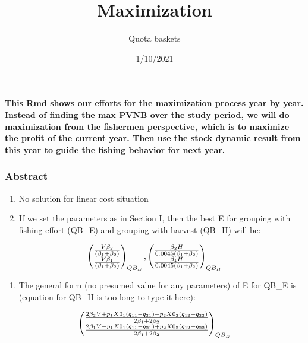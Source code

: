 \documentclass[
]{article}
\title{Maximization}
\author{Quota baskets}
\date{1/10/2021}
\providecommand{\tightlist}{%
  \setlength{\itemsep}{0pt}\setlength{\parskip}{0pt}}
\begin{document}
\maketitle

{
\setcounter{tocdepth}{2}
\tableofcontents
}
\textbf{This Rmd shows our efforts for the maximization process year by
year. Instead of finding the max PVNB over the study period, we will do
maximization from the fishermen perspective, which is to maximize the
profit of the current year. Then use the stock dynamic result from this
year to guide the fishing behavior for next year.}

\hypertarget{abstract}{%
\subsubsection{Abstract}\label{abstract}}

\begin{enumerate}
\def\labelenumi{\arabic{enumi}.}
\item
  No solution for linear cost situation
\item
  If we set the parameters as in Section I, then the best E for grouping
  with fishing effort (QB\_E) and grouping with harvest (QB\_H) will be:
\end{enumerate}

\[
\begin{pmatrix}
{V\beta_2\over (\beta_1 + \beta_2)}\\
{V\beta_1\over (\beta_1 + \beta_2)}
\end{pmatrix}_{QB_E},
\begin{pmatrix}
{\beta_2H\over 0.0045(\beta_1+\beta_2)} \\
{\beta_1H\over 0.0045(\beta_1+\beta_2)}\\
\end{pmatrix}_{QB_H}
\]

\begin{enumerate}
\def\labelenumi{\arabic{enumi}.}
\setcounter{enumi}{2}
\tightlist
\item
  The general form (no presumed value for any parameters) of E for QB\_E
  is (equation for QB\_H is too long to type it here):
\end{enumerate}

\[
\begin{pmatrix}
{2\beta_2V+p_1X0_1(q_{11}-q_{21})-p_2X0_2(q_{12}-q_{22})\over 2\beta_1+2\beta_2}\\
{2\beta_1V-p_1X0_1(q_{11}-q_{21})+p_2X0_2(q_{12}-q_{22})\over 2\beta_1+2\beta_2}
\end{pmatrix}_{QB_E}
\]
\end{document}
